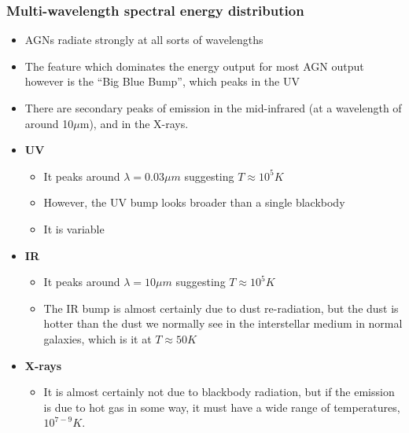 \documentclass{article}
\begin{document}
\subsubsection{Multi-wavelength spectral energy distribution}
\begin{itemize}
\item AGNs radiate strongly at all sorts of wavelengths
\item The feature which dominates the energy output for most
AGN output however is the “Big Blue Bump”, which peaks in the UV 
\item There are secondary peaks of emission in the mid-infrared (at a wavelength of around 10$\mu $m), and in the X-rays.
\item \textbf{UV}
\begin{itemize}
\item  It peaks around $\lambda = 0.03 \mu m$ suggesting $T \approx 10^5K$
\item  However, the UV bump looks broader than a single blackbody
\item  It is variable 
\end{itemize}
\item \textbf{IR}
\begin{itemize}
\item   It peaks around $\lambda = 10 \mu m$ suggesting $T \approx 10^5K$
\item The IR bump is almost certainly due to dust re-radiation, but the dust is hotter than the dust we normally see in the interstellar medium in normal galaxies, which is it at $T \approx 50K$
\end{itemize}
\item \textbf{X-rays}
\begin{itemize}
\item  It is almost certainly not due to blackbody radiation, but if the emission is due to hot gas in some way, it must
have a wide range of temperatures, $10^{7-9}K$.
\end{itemize}
\end{itemize}
\end{document}
